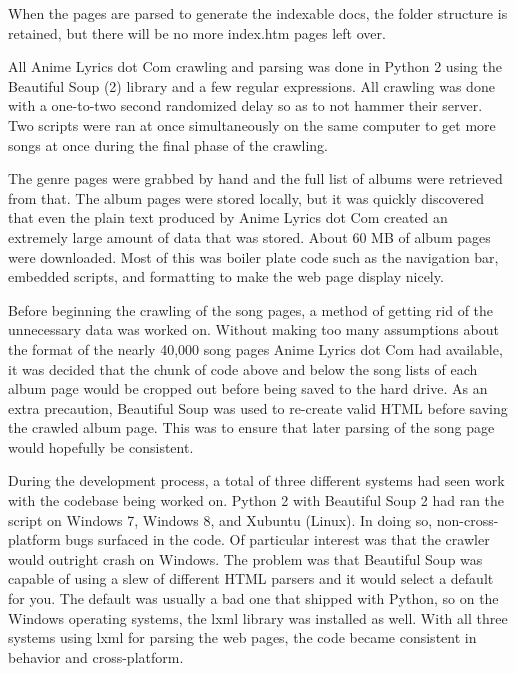 \documentclass{acm} %
\begin{document}
\begin{CJK}{UTF8}{zhsong}

When the pages are parsed to generate the indexable docs, the folder structure is retained, but there will be no more index.htm pages left over.

All Anime Lyrics dot Com crawling and parsing was done in Python 2 using the Beautiful Soup (2) library and a few regular expressions. All crawling was done with a one-to-two second randomized delay so as to not hammer their server. Two scripts were ran at once simultaneously on the same computer to get more songs at once during the final phase of the crawling.

The genre pages were grabbed by hand and the full list of albums were retrieved from that. The album pages were stored locally, but it was quickly discovered that even the plain text produced by Anime Lyrics dot Com created an extremely large amount of data that was stored. About 60 MB of album pages were downloaded. Most of this was boiler plate code such as the navigation bar, embedded scripts, and formatting to make the web page display nicely.

Before beginning the crawling of the song pages, a method of getting rid of the unnecessary data was worked on. Without making too many assumptions about the format of the nearly 40,000 song pages Anime Lyrics dot Com had available, it was decided that the chunk of code above and below the song lists of each album page would be cropped out before being saved to the hard drive. As an extra precaution, Beautiful Soup was used to re-create valid HTML before saving the crawled album page. This was to ensure that later parsing of the song page would hopefully be consistent.

During the development process, a total of three different systems had seen work with the codebase being worked on. Python 2 with Beautiful Soup 2 had ran the script on Windows 7, Windows 8, and Xubuntu (Linux). In doing so, non-cross-platform bugs surfaced in the code. Of particular interest was that the crawler would outright crash on Windows. The problem was that Beautiful Soup was capable of using a slew of different HTML parsers and it would select a default for you. The default was usually a bad one that shipped with Python, so on the Windows operating systems, the lxml library was installed as well. With all three systems using lxml for parsing the web pages, the code became consistent in behavior and cross-platform.


\end{CJK}
\end{document}

